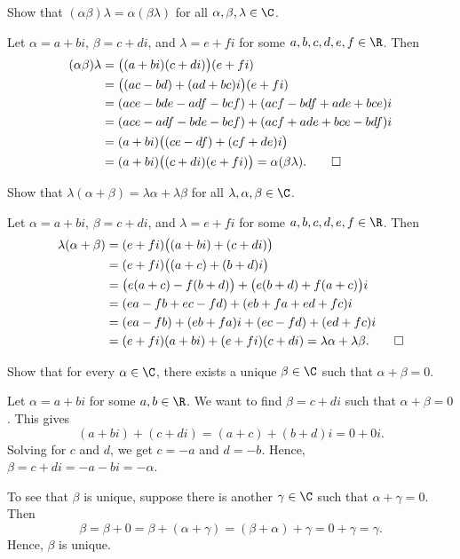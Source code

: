 \begin{exercise}
Show that $(\alpha\beta)\lambda=\alpha(\beta\lambda)$ for all
$\alpha,\beta,\lambda\in\C$.
\end{exercise}
\begin{solution}
Let $\alpha=a+bi$, $\beta=c+di$, and $\lambda=e+fi$ for some
$a,b,c,d,e,f\in\R$. Then
\begin{align*}
(\alpha\beta)\lambda &= \bigl((a+bi)(c+di)\bigr)(e+fi)\\
  &= \bigl((ac-bd)+(ad+bc)i\bigr)(e+fi)\\
  &= (ace-bde-adf-bcf)+(acf-bdf+ade+bce)i\\
  &= (ace-adf-bde-bcf)+(acf+ade+bce-bdf)i\\
  &= (a+bi)\bigl((ce-df)+(cf+de)i\bigr)\\
  &= (a+bi)\bigl((c+di)(e+fi)\bigr) = \alpha(\beta\lambda). \qedhere
\end{align*}
\end{solution}

\begin{exercise}
Show that $\lambda(\alpha+\beta)=\lambda\alpha+\lambda\beta$ for all
$\lambda,\alpha,\beta\in\C$.
\end{exercise}
\begin{solution}
Let $\alpha=a+bi$, $\beta=c+di$, and $\lambda=e+fi$ for some
$a,b,c,d,e,f\in\R$. Then
\begin{align*}
\lambda(\alpha+\beta) &= (e+fi)\bigl((a+bi)+(c+di)\bigr)\\
  &= (e+fi)\bigl((a+c)+(b+d)i\bigr)\\
  &= \bigl(e(a+c)-f(b+d)\bigr)+\bigl(e(b+d)+f(a+c)\bigr)i\\
  &= (ea-fb+ec-fd)+(eb+fa+ed+fc)i\\
  &= (ea-fb)+(eb+fa)i+(ec-fd)+(ed+fc)i\\
  &= (e+fi)(a+bi)+(e+fi)(c+di) = \lambda\alpha+\lambda\beta. \qedhere
\end{align*}
\end{solution}

\begin{exercise}
Show that for every $\alpha\in\C$, there exists a unique $\beta\in\C$ such that
$\alpha+\beta=0$.
\end{exercise}
\begin{solution}
Let $\alpha=a+bi$ for some $a,b\in\R$. We want to find $\beta=c+di$ such that
$\alpha+\beta=0$. This gives
\[ (a+bi)+(c+di) = (a+c)+(b+d)i = 0+0i. \]
Solving for $c$ and $d$, we get $c=-a$ and $d=-b$. Hence,
$\beta=c+di=-a-bi=-\alpha$.

To see that $\beta$ is unique, suppose there is another $\gamma\in\C$ such that
$\alpha+\gamma=0$. Then
\[ \beta=\beta+0=\beta+(\alpha+\gamma)=(\beta+\alpha)+\gamma=0+\gamma=\gamma. \]
Hence, $\beta$ is unique.
\end{solution}

